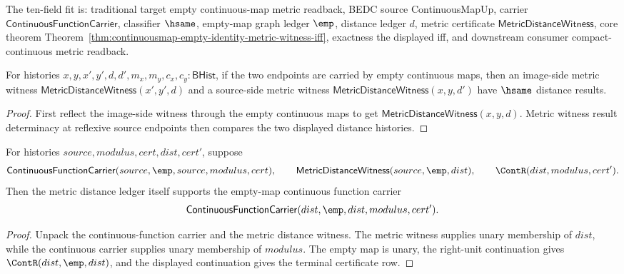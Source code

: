 The ten-field fit is: traditional target empty continuous-map metric readback,
BEDC source ContinuousMapUp, carrier $\mathsf{ContinuousFunctionCarrier}$,
classifier $\hsame$, empty-map graph ledger $\emp$, distance ledger $d$,
metric certificate $\mathsf{MetricDistanceWitness}$, core theorem
Theorem~\ref{thm:continuousmap-empty-identity-metric-witness-iff}, exactness
the displayed iff, and downstream consumer compact-continuous metric readback.

\begin{theorem}
\label{thm:continuousmap-empty-identity-metric-result-deterministic}
For histories $x,y,x',y',d,d',m_x,m_y,c_x,c_y:\mathsf{BHist}$, if the two
endpoints are carried by empty continuous maps, then an image-side metric
witness $\mathsf{MetricDistanceWitness}(x',y',d)$ and a source-side metric
witness $\mathsf{MetricDistanceWitness}(x,y,d')$ have $\hsame$ distance
results.
\end{theorem}
\begin{proof}
First reflect the image-side witness through the empty continuous maps to get
$\mathsf{MetricDistanceWitness}(x,y,d)$. Metric witness result determinacy at
reflexive source endpoints then compares the two displayed distance histories.
\end{proof}

\begin{theorem}
\label{thm:continuousmap-empty-target-metric-rebased-carrier}
For histories $source,modulus,cert,dist,cert'$, suppose
$$
\mathsf{ContinuousFunctionCarrier}(source,\emp,source,modulus,cert),
\qquad
\mathsf{MetricDistanceWitness}(source,\emp,dist),
\qquad
\ContR(dist,modulus,cert').
$$
Then the metric distance ledger itself supports the empty-map continuous
function carrier
$$
\mathsf{ContinuousFunctionCarrier}(dist,\emp,dist,modulus,cert').
$$
\end{theorem}
\begin{proof}
Unpack the continuous-function carrier and the metric distance witness. The
metric witness supplies unary membership of $dist$, while the continuous
carrier supplies unary membership of $modulus$. The empty map is unary, the
right-unit continuation gives $\ContR(dist,\emp,dist)$, and the displayed
continuation gives the terminal certificate row.
\end{proof}

